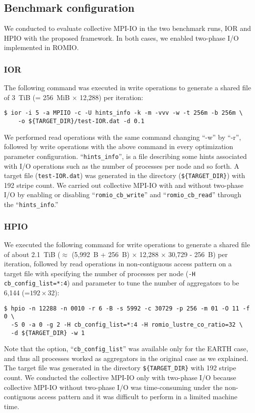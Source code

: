 \documentclass{jhps}
\begin{document}
\subsection{Benchmark configuration}

We conducted to evaluate collective MPI-IO in the two benchmark runs, IOR and HPIO
with the proposed framework.
In both cases, we enabled two-phase I/O implemented in ROMIO.

\subsubsection{IOR}
\label{ssec:IOR_CONFIG}

The following command was executed in write operations to generate
a shared file of 3~TiB (= 256~MiB $\times$ 12,288) per iteration:
%
\begin{verbatim}
$ ior -i 5 -a MPIIO -c -U hints_info -k -m -vvv -w -t 256m -b 256m \
	-o ${TARGET_DIR}/test-IOR.dat -d 0.1
\end{verbatim}
%
We performed read operations with the same command changing ``-w'' by ``-r'',
followed by write operations with the above command
in every optimization parameter configuration.
``{\tt hints\_info}'', is a file describing some hints associated with
I/O operations such as the number of processes per node and so forth.
A target file ({\tt test-IOR.dat}) was generated in the directory
({\tt \$\{TARGET\_DIR\}}) with 192 stripe count.
We carried out collective MPI-IO with and without two-phase I/O by enabling
or disabling ``{\tt romio\_cb\_write}'' and ``{\tt romio\_cb\_read}''
through the ``{\tt hints\_info}.''
%

\subsubsection{HPIO}
\label{ssec:HPIO_CONFIG}

We executed the following command for write operations to generate
a shared file of about 2.1~TiB ($\approx$ (5,992~B + 256~B) $\times$ 12,288 $\times$ 30,729 - 256~B)
per iteration, followed by read operations in non-contiguous access pattern
on a target file with specifying the number of processes per node ({\tt -H cb\_config\_list=*:4})
and parameter to tune the number of aggregators to be 6,144 (=$192 \times 32$):
%
\begin{verbatim}
$ hpio -n 12288 -n 0010 -r 6 -B -s 5992 -c 30729 -p 256 -m 01 -O 11 -f 0 \
  -S 0 -a 0 -g 2 -H cb_config_list=*:4 -H romio_lustre_co_ratio=32 \
  -d ${TARGET_DIR} -w 1
\end{verbatim}
%
Note that the option, ``{\tt cb\_config\_list}'' was available only for
the EARTH case, and thus all processes worked as aggregators
in the original case as we explained.
The target file was generated in the directory {\tt \$\{TARGET\_DIR\}}
with 192 stripe count. We conducted the collective MPI-IO
only with two-phase I/O because collective MPI-IO without two-phase I/O was
time-consuming under the non-contiguous access pattern and
it was difficult to perform in a limited machine time.
\end{document}
